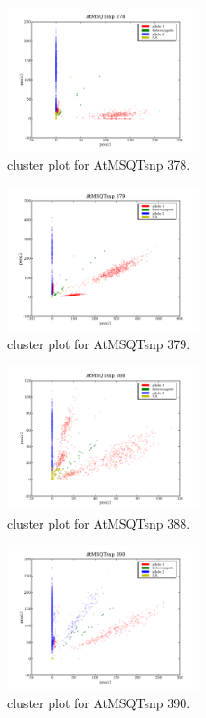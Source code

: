 \begin{figure}[H]
\includegraphics[width=0.5\textwidth]{figures/cluster_plot_AtMSQTsnp_378.png}
\caption{cluster plot for AtMSQTsnp 378.} \label{flAtMSQTsnp378}
\end{figure}

\begin{figure}[H]
\includegraphics[width=0.5\textwidth]{figures/cluster_plot_AtMSQTsnp_379.png}
\caption{cluster plot for AtMSQTsnp 379.} \label{flAtMSQTsnp379}
\end{figure}

\begin{figure}[H]
\includegraphics[width=0.5\textwidth]{figures/cluster_plot_AtMSQTsnp_388.png}
\caption{cluster plot for AtMSQTsnp 388.} \label{flAtMSQTsnp388}
\end{figure}

\begin{figure}[H]
\includegraphics[width=0.5\textwidth]{figures/cluster_plot_AtMSQTsnp_390.png}
\caption{cluster plot for AtMSQTsnp 390.} \label{flAtMSQTsnp390}
\end{figure}

